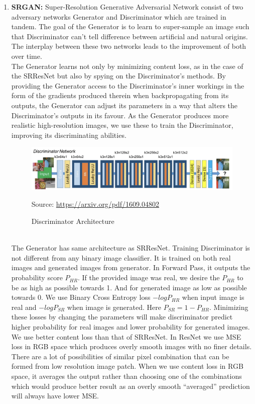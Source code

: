 \begin{enumerate}[label=(\roman*)]
    \item {\bf SRGAN:} Super-Resolution Generative Adversarial Network consist of two adversary networks Generator and Discriminator which are trained in tandem. The goal of the Generator is to learn to super-sample an image such that Discriminator can’t tell difference between artificial and natural origins. The interplay between these two networks leads to the improvement of both over time. \\
    The Generator learns not only by minimizing content loss, as in the case of the SRResNet but also by spying on the Discriminator's methods. By providing the Generator access to the Discriminator's inner workings in the form of the gradients produced therein when backpropagating from its outputs, the Generator can adjust its parameters in a way that alters the Discriminator's outputs in its favour. As the Generator produces more realistic high-resolution images, we use these to train the Discriminator, improving its discriminating abilities.
    \begin{figure}[ht]
        \centering
        \includegraphics[width=6in]{./figures/discriminator.png}
        \caption{Discriminator Architecture}
        \par  Source: \url{https://arxiv.org/pdf/1609.04802}
    \end{figure} \\
    The Generator has same architecture as SRResNet. Training Discriminator is not different from any binary image classifier. It is trained on both real images and generated images from generator. In Forward Pass, it outputs the probability score $P_{HR}$. If the provided image was real, we desire the $P_{HR}$ to be as high as possible towards 1. And for generated image as low as possible towards 0. We use Binary Cross Entropy loss $-logP_{HR}$ when input image is real and $-logP_{SR}$ when image is generated. Here $P_{SR}=1-P_{HR}$. Minimizing these losses by changing the parameters will make discriminator predict higher probability for real images and lower probability for generated images.\\
    We use better content loss than that of SRResNet. In ResNet we use MSE loss in RGB space which produces overly smooth images with no finer details. There are a lot of possibilities of similar pixel combination that can be formed from low resolution image patch. When we use content loss in RGB space, it averages the output rather than choosing one of the combinations which would produce better result as an overly smooth “averaged” prediction will always have lower MSE.\\

\end{enumerate}
